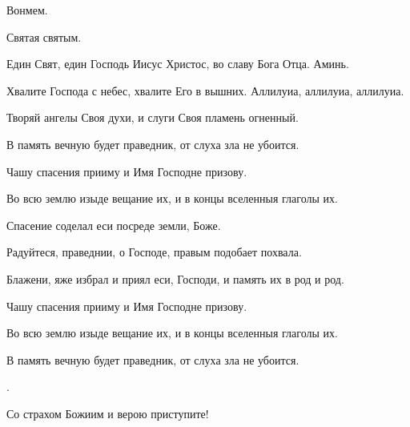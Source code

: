 \begin{mymulticols}
 Вонмем. 


 Святая святым. 

 Един Свят, един Господь Иисус Христос, во славу Бога Отца. Аминь. 






 Хвалите Господа с небес, хвалите Его в вышних. Аллилуиа, аллилуиа, аллилуиа. 

 Творяй ангелы Своя духи, и слуги Своя пламень огненный. 

 В память вечную будет праведник, от слуха зла не убоится. 

 Чашу спасения прииму и Имя Господне призову. 

 Во всю землю изыде вещание их, и в концы вселенныя глаголы их. 

 Спасение соделал еси посреде земли, Боже. 

 Радуйтеся, праведнии, о Господе, правым подобает похвала. 

 Блажени, яже избрал и приял еси, Господи, и память их в род и род. 

 Чашу спасения прииму и Имя Господне призову. 

 Во всю землю изыде вещание их, и в концы вселенныя глаголы их. 

 В память вечную будет праведник, от слуха зла не убоится. 

.

 Со страхом Божиим и верою приступите! 


\end{mymulticols}
